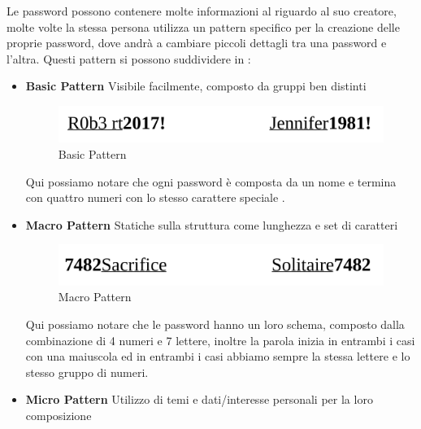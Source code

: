 Le password possono contenere molte informazioni al riguardo al suo creatore, molte volte la stessa persona utilizza un pattern specifico per la creazione delle proprie password, dove andrà a cambiare piccoli dettagli tra una password e l'altra.
Questi pattern si possono suddividere in :
\begin{itemize}
    \item \textbf{Basic Pattern}\newline
          Visibile facilmente, composto da gruppi ben distinti\newline
          \begin{figure}[h]
              \centering
              \includegraphics[width=\linewidth]{Immagini/introduzione/Basic_Pattern.png}
              \caption{Basic Pattern}
              \label{fig:basic}
          \end{figure}
          \newline Qui possiamo notare che ogni password è composta da un nome e termina con quattro numeri con lo stesso carattere speciale \!.
    \item \textbf{Macro Pattern}\newline
          Statiche sulla struttura come lunghezza e set di caratteri\newline
          \begin{figure}[h]
              \centering
              \includegraphics[width=\linewidth]{Immagini/introduzione/Macro_pattern.png}
              \caption{Macro Pattern}
              \label{fig:macro}
          \end{figure}
          \newline Qui possiamo notare che le password hanno un loro schema, composto dalla combinazione di 4 numeri e 7 lettere, inoltre la parola inizia in entrambi i casi con una maiuscola ed in entrambi i casi abbiamo sempre la stessa lettere e lo stesso gruppo di numeri.
    \item \textbf{Micro Pattern}\newline
          Utilizzo di temi e dati/interesse personali per la loro composizione\newline

\end{itemize}
